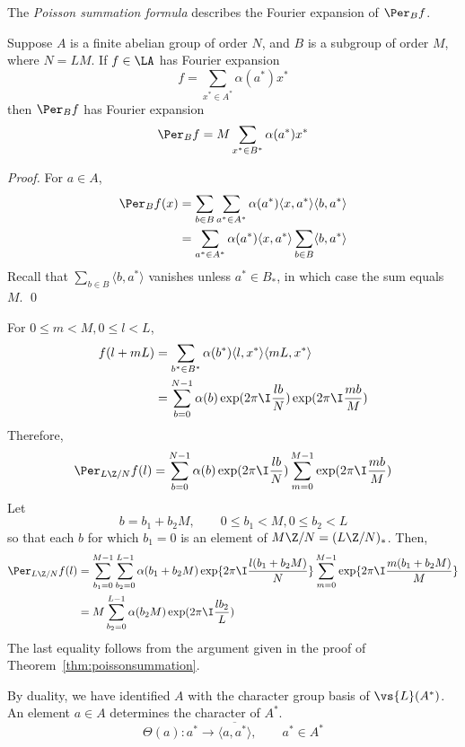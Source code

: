 The \emph{Poisson summation formula} describes the Fourier expansion of
$\Per_B f$.
\begin{theorem}\label{thm:poissonsummation}
Suppose $A$ is a finite abelian group of order $N$, and $B$ is a subgroup of
order $M$, where $N = LM$.  If $f\in \LA$ has Fourier expansion 
\[
f = \sum_{x^* \in A^*} \alpha(a^*) x^*
\]
then $\Per_B f$ has Fourier expansion
\[
\Per_B f = M \sum_{x^* \in B^*} \alpha(a^*) x^*
\]
\end{theorem}
\begin{proof}
For $a \in A$,
\begin{align*}
\Per_B f(x) 
&= \sum_{b \in B}\sum_{a^* \in A^*} \alpha(a^*) \langle x,a^*\rangle \langle b,a^*\rangle\\
&= \sum_{a^* \in A^*} \alpha(a^*) \langle x,a^*\rangle \sum_{b \in B}\langle b,a^*\rangle
\end{align*}
Recall that $\sum_{b \in B}\langle b,a^*\rangle$ vanishes unless $a^* \in B_*$,
in which case the sum equals $M$. \qed
\end{proof}
\begin{example}
For $0\leq m < M, 0 \leq l < L$, 
\begin{align*}
f(l+mL) &= \sum_{b^* \in B^*} \alpha(b^*) \langle l, x^*\rangle \langle mL, x^*\rangle\\
        &= \sum_{b = 0}^{N-1} \alpha(b) \exp(2\pi \I \frac{lb}{N})\exp(2\pi \I \frac{mb}{M})
\end{align*}
Therefore,
\[
\Per_{L\Z/N} f(l)= \sum_{b = 0}^{N-1} \alpha(b) \exp(2\pi \I \frac{lb}{N})\sum_{m = 0}^{M-1} \exp(2\pi \I \frac{mb}{M})
\]
Let
\[
b = b_1 + b_2M, \qquad 0\leq b_1 < M, 0\leq b_2 < L
\]
so that each $b$ for which $b_1 = 0$ is an element of $M\Z/N = (L\Z/N)_*$.  Then,
\begin{align*}
\Per_{L\Z/N} f(l)&= 
\sum_{b_1 = 0}^{M-1}\sum_{b_2 = 0}^{L-1} \alpha(b_1+b_2M) 
\exp\{2\pi \I \frac{l(b_1+b_2M)}{N}\}\sum_{m = 0}^{M-1} \exp\{2\pi \I \frac{m(b_1+b_2M)}{M}\}\\
&= M \sum_{b_2 = 0}^{L-1} \alpha(b_2M) 
\exp(2\pi \I \frac{lb_2}{L})
\end{align*}
The last equality follows from the argument given in the proof of Theorem~\ref{thm:poissonsummation}.
\end{example}
By duality, we have identified $A$ with the character group basis of
$\vs{L}(A^*)$.  An element $a\in A$ determines the character of $A^*$.
\[
\varTheta(a):a^* \to \overline{\langle a,a^* \rangle}, \qquad a^*\in A^*
\]


